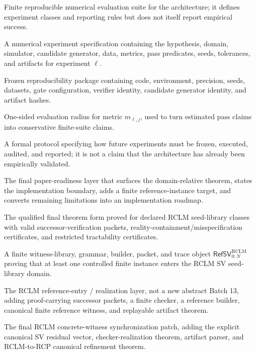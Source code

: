 \documentclass[11pt,a4paper]{article}
\newcommand{\RCLM}{\mathrm{RCLM}}
\newcommand{\eval}{\mathrm{eval}}
\begin{document}
\begin{description}[leftmargin=2.8cm, style=nextline]
    \item[\(\mathsf{EvalSuite}^{\RCLM}_T\)] Finite reproducible numerical evaluation suite for the architecture; it defines experiment classes and reporting rules but does not itself report empirical success.
    \item[\(\mathfrak E_\ell\)] A numerical experiment specification containing the hypothesis, domain, simulator, candidate generator, data, metrics, pass predicates, seeds, tolerances, and artifacts for experiment \(\ell\).
    \item[\(\mathsf{ReproPack}_T\)] Frozen reproducibility package containing code, environment, precision, seeds, datasets, gate configuration, verifier identity, candidate generator identity, and artifact hashes.
    \item[\(\Delta_{\ell,j}^{\eval}\)] One-sided evaluation radius for metric \(m_{\ell,j}\), used to turn estimated pass claims into conservative finite-suite claims.
    \item[Reproducible numerical evaluation protocol] A formal protocol specifying how future experiments must be frozen, executed, audited, and reported; it is not a claim that the architecture has already been empirically validated.
    \item[Architecture finalization / instantiation readiness] The final paper-readiness layer that surfaces the domain-relative theorem, states the implementation boundary, adds a finite reference-instance target, and converts remaining limitations into an implementation roadmap.
    \item[Domain-relative robust reflective successor theorem] The qualified final theorem form proved for declared RCLM seed-library classes with valid successor-verification packets, reality-containment/misspecification certificates, and restricted tractability certificates.
    \item[Minimal finite RCLM SV reference instance] A finite witness-library, grammar, builder, packet, and trace object \(\mathsf{RefSV}_{0:N}^{\RCLM}\) proving that at least one controlled finite instance enters the RCLM SV seed-library domain.
    \item[Batch-13R] The RCLM reference-entry / realization layer, not a new abstract Batch 13, adding proof-carrying successor packets, a finite checker, a reference builder, canonical finite reference witness, and replayable artifact theorem.
    \item[Batch-13R-A] The final RCLM concrete-witness synchronization patch, adding the explicit canonical SV residual vector, checker-realization theorem, artifact parser, and RCLM-to-RCP canonical refinement theorem.

\end{description}
\end{document}
